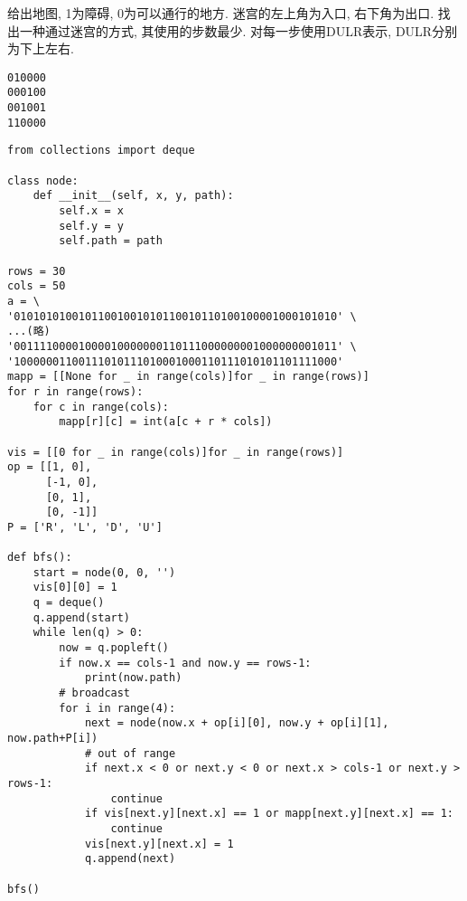 \documentclass[../main]{subfiles}
\begin{document}
\begin{sloppy}
给出地图, 1为障碍, 0为可以通行的地方. 迷宫的左上角为入口, 右下角为出口. 找出一种通过迷宫的方式, 其使用的步数最少. 对每一步使用DULR表示, DULR分别为下上左右.

\begin{verbatim}
010000
000100
001001
110000
\end{verbatim}

\begin{lstlisting}[style = Python]
from collections import deque

class node:
    def __init__(self, x, y, path):
        self.x = x
        self.y = y
        self.path = path

rows = 30
cols = 50
a = \
'01010101001011001001010110010110100100001000101010' \
...(略)
'00111100001000010000000110111000000001000000001011' \
'10000001100111010111010001000110111010101101111000'
mapp = [[None for _ in range(cols)]for _ in range(rows)]
for r in range(rows):
    for c in range(cols):
        mapp[r][c] = int(a[c + r * cols])

vis = [[0 for _ in range(cols)]for _ in range(rows)]
op = [[1, 0],
      [-1, 0],
      [0, 1],
      [0, -1]]
P = ['R', 'L', 'D', 'U']

def bfs():
    start = node(0, 0, '')
    vis[0][0] = 1
    q = deque()
    q.append(start)
    while len(q) > 0:
        now = q.popleft()
        if now.x == cols-1 and now.y == rows-1:
            print(now.path)
        # broadcast
        for i in range(4):
            next = node(now.x + op[i][0], now.y + op[i][1], now.path+P[i])
            # out of range
            if next.x < 0 or next.y < 0 or next.x > cols-1 or next.y > rows-1:
                continue
            if vis[next.y][next.x] == 1 or mapp[next.y][next.x] == 1:
                continue
            vis[next.y][next.x] = 1
            q.append(next)

bfs()
\end{lstlisting}





    
    


\end{sloppy}
\end{document}
